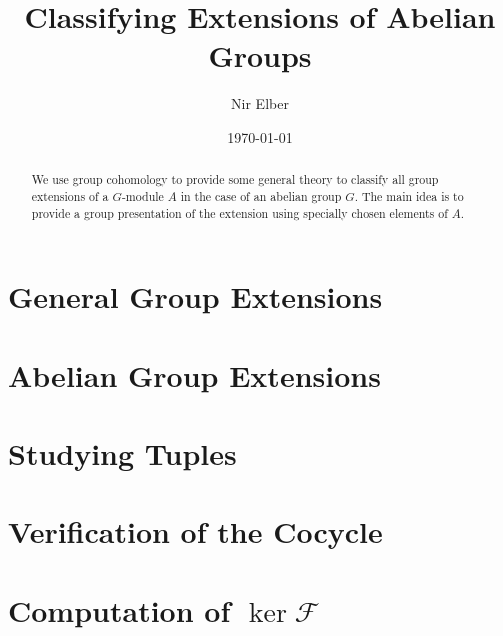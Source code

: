 \documentclass{article}
\title{Classifying Extensions of Abelian Groups}
\author{Nir Elber}
\date{\today}
\numberwithin{equation}{section}
\begin{document}
\maketitle

\begin{abstract}
	\noindent We use group cohomology to provide some general theory to classify all group extensions of a $ G$-module $A$ in the case of an abelian group $ G$. The main idea is to provide a group presentation of the extension using specially chosen elements of $A$.
\end{abstract}

\setcounter{tocdepth}{4}
\tableofcontents

\section{General Group Extensions} \label{sec:general}


\section{Abelian Group Extensions} \label{sec:abelian}


\section{Studying Tuples} \label{sec:tuplestudy}


\printbibliography[heading=bibintoc,title={References}]

\newpage
\appendix
\section{Verification of the Cocycle} \label{sec:verifycocycle}


\section{Computation of \texorpdfstring{$\ker\mathcal F$}{ker F}} \label{sec:havegensproof}

\end{document}
